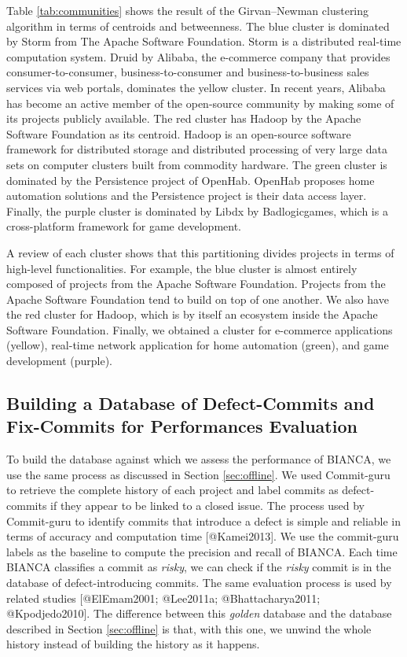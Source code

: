 Table \ref{tab:communities} shows the result of the Girvan--Newman
clustering algorithm in terms of centroids and betweenness. The blue
cluster is dominated by Storm from The Apache Software Foundation. Storm
is a distributed real-time computation system. Druid by Alibaba, the
e-commerce company that provides consumer-to-consumer,
business-to-consumer and business-to-business sales services via web
portals, dominates the yellow cluster. In recent years, Alibaba has
become an active member of the open-source community by making some of
its projects publicly available. The red cluster has Hadoop by the
Apache Software Foundation as its centroid. Hadoop is an open-source
software framework for distributed storage and distributed processing of
very large data sets on computer clusters built from commodity hardware.
The green cluster is dominated by the Persistence project of OpenHab.
OpenHab proposes home automation solutions and the Persistence project
is their data access layer. Finally, the purple cluster is dominated by
Libdx by Badlogicgames, which is a cross-platform framework for game
development.

A review of each cluster shows that this partitioning divides projects
in terms of high-level functionalities. For example, the blue cluster is
almost entirely composed of projects from the Apache Software
Foundation. Projects from the Apache Software Foundation tend to build
on top of one another. We also have the red cluster for Hadoop, which is
by itself an ecosystem inside the Apache Software Foundation. Finally,
we obtained a cluster for e-commerce applications (yellow), real-time
network application for home automation (green), and game development
(purple).



\subsection{Building a Database of Defect-Commits and Fix-Commits for
Performances Evaluation}\label{sub:golden}

To build the database against which we assess the performance of BIANCA,
we use the same process as discussed in Section \ref{sec:offline}. We
used Commit-guru to retrieve the complete history of each project and
label commits as defect-commits if they appear to be linked to a closed
issue. The process used by Commit-guru to identify commits that
introduce a defect is simple and reliable in terms of accuracy and
computation time {[}@Kamei2013{]}. We use the commit-guru labels as the
baseline to compute the precision and recall of BIANCA. Each time BIANCA
classifies a commit as \emph{risky}, we can check if the \emph{risky}
commit is in the database of defect-introducing commits. The same
evaluation process is used by related studies {[}@ElEmam2001; @Lee2011a;
@Bhattacharya2011; @Kpodjedo2010{]}. The difference between this
\emph{golden} database and the database described in Section
\ref{sec:offline} is that, with this one, we unwind the whole history
instead of building the history as it happens.

